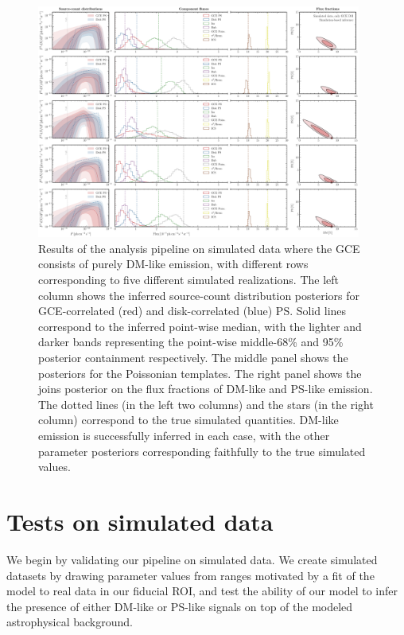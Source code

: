 \documentclass[prd,aps,10pt,nofootinbib,twocolumn,superscriptaddress,preprintnumbers,balancelastpage,longbibliography]{revtex4-1}
\begin{document}
%
\begin{figure}
    \centering
    \includegraphics[width=0.95\textwidth]{plots/sim_sbi_dm.pdf}
    \caption{Results of the analysis pipeline on simulated \Fermi data where the GCE consists of purely DM-like emission, with different rows corresponding to five different simulated realizations. The left column shows the inferred source-count distribution posteriors for GCE-correlated (red) and disk-correlated (blue) PS. Solid lines correspond to the inferred point-wise median, with the lighter and darker bands representing the point-wise middle-68\% and 95\% posterior containment respectively. The middle panel shows the posteriors for the Poissonian templates. The right panel shows the joins posterior on the flux fractions of DM-like and PS-like emission. The dotted lines (in the left two columns) and the stars (in the right column) correspond to the true simulated quantities. DM-like emission is successfully inferred in each case, with the other parameter posteriors corresponding faithfully to the true simulated values.} 
    \label{fig:sim_sbi_dm}
\end{figure}
%

\section{Tests on simulated data}
\label{sec:simulations}

We begin by validating our pipeline on simulated \Fermi data. We create simulated datasets by drawing parameter values from ranges motivated by a fit of the model to real \Fermi data in our fiducial ROI, and test the ability of our model to infer the presence of either DM-like or PS-like signals on top of the modeled astrophysical background.
\end{document}
